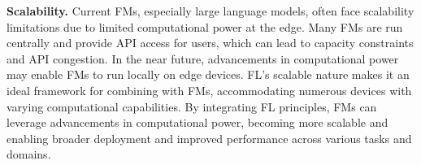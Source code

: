 \textbf{Scalability.}
Current FMs, especially large language models, often face scalability limitations due to limited computational power at the edge. Many FMs are run centrally and provide API access for users, which can lead to capacity constraints and API congestion. In the near future, advancements in computational power may enable FMs to run locally on edge devices. FL's scalable nature makes it an ideal framework for combining with FMs, accommodating numerous devices with varying computational capabilities. By integrating FL principles, FMs can leverage advancements in computational power, becoming more scalable and enabling broader deployment and improved performance across various tasks and domains.



